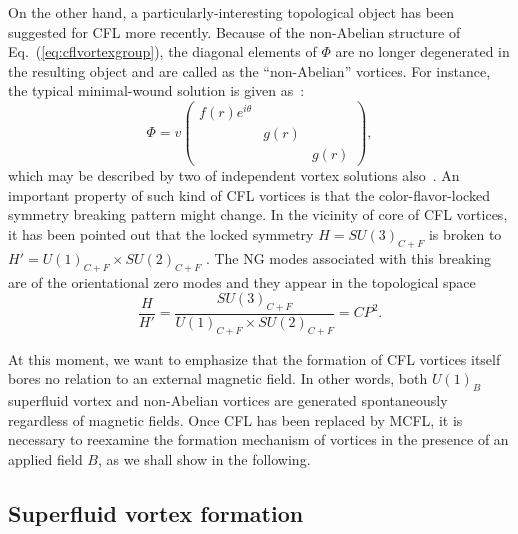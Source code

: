 On the other hand, a particularly-interesting topological object has been suggested for
CFL more recently. Because of the non-Abelian structure of Eq.~(\ref{eq:cflvortexgroup}), the
diagonal elements of $\Phi$ are no longer degenerated in the resulting object and are called as
the ``non-Abelian'' vortices. For instance, the typical minimal-wound solution is given
as~\cite{nakano2008non,eto2009color}:
\begin{equation}
  \label{eq:nvortex}
  \Phi = v\begin{pmatrix}
   f(r)e^{i\theta} & & \\ & g(r) & \\ & & g(r)
  \end{pmatrix},
\end{equation}
which may be described by two of independent vortex solutions also~\cite{balachandran2006semisuperfluid}.
An important property of such kind of CFL vortices
%
is that the color-flavor-locked symmetry breaking pattern might change. In the vicinity of core of CFL
vortices, it has been pointed out that the locked symmetry $H={SU(3)_{C+F}}$ is broken to
$H' =U(1)_{C+F} \times SU(2)_{C+F}$ \cite{nakano2008non,vinci2012spontaneous}.
The NG modes associated with this breaking are of the orientational zero modes and they appear in the
topological space
\begin{equation}
  \label{eq:cp2}
 \frac{H}{H'} = \frac{SU(3)_{C+F}}{U(1)_{C+F} \times SU(2)_{C+F}} = CP^2.
\end{equation}

At this moment, we want to emphasize that the formation of CFL vortices itself bores no relation to an
external magnetic field. In other words, both $U(1)_{B}$ superfluid vortex and non-Abelian vortices are
generated spontaneously regardless of magnetic fields.
Once CFL has been replaced by MCFL, it is necessary to reexamine the formation mechanism of vortices in
the presence of an applied field $B$, as we shall show in the following.

\subsection{Superfluid vortex formation }
\label{sssec:4}

